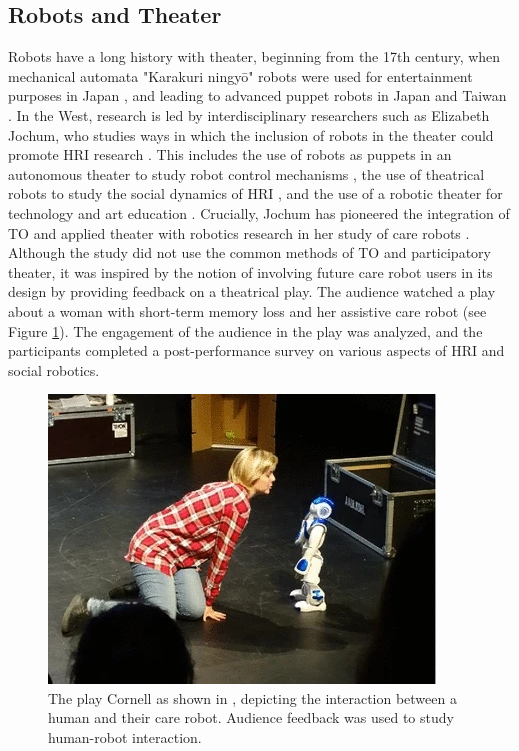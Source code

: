 \documentclass[dissertation,math,vertlayout,pdfa,colorlinks]{aaltoseries}
\begin{document}
\subsection{Robots and Theater}
Robots have a long history with theater, beginning from the 17th century, when mechanical automata "Karakuri ningyō" robots were used for entertainment purposes in Japan \cite{knightEightLessonsLearned2011}, and leading to advanced puppet robots in Japan \cite{sakashitaYouPuppetEvaluation2017, kawaharaTransformedHumanPresence2016} and Taiwan \cite{huGlovePuppetRobot2008}. In the West, research is led by interdisciplinary researchers such as Elizabeth Jochum, who studies ways in which the inclusion of robots in the theater could promote HRI research \cite{jochumRehearsalRobotRevolution2014, samaniCurtainCreativeRobotics2025}. This includes the use of robots as puppets in an autonomous theater to study robot control mechanisms \cite{jochumRoboticPuppetsEngineering2014}, the use of theatrical robots to study the social dynamics of HRI \cite{katevasRobotComedyLab2015}, and the use of a robotic theater for technology and art education \cite{bravosanchezInteractiveDramaRobots2017,dongChildRobotMusicalTheater2024}. Crucially, Jochum has pioneered the integration of TO and applied theater with robotics research in her study of care robots \cite{jochumUsingTheatreStudy2016}. Although the study did not use the common methods of TO and participatory theater, it was inspired by the notion of involving future care robot users in its design by providing feedback on a theatrical play. The audience watched a play about a woman with short-term memory loss and her assistive care robot (see Figure \ref{fig:cornell}). The engagement of the audience in the play was analyzed, and the participants completed a post-performance survey on various aspects of HRI and social robotics. 

\begin{figure}
    \centering
    \includegraphics[width=0.7\linewidth]{jochum.png}
    \caption{The play Cornell as shown in \cite{jochumUsingTheatreStudy2016}, depicting the interaction between a human and their care robot. Audience feedback was used to study human-robot interaction.}
    \label{fig:cornell}
\end{figure}
\end{document}
